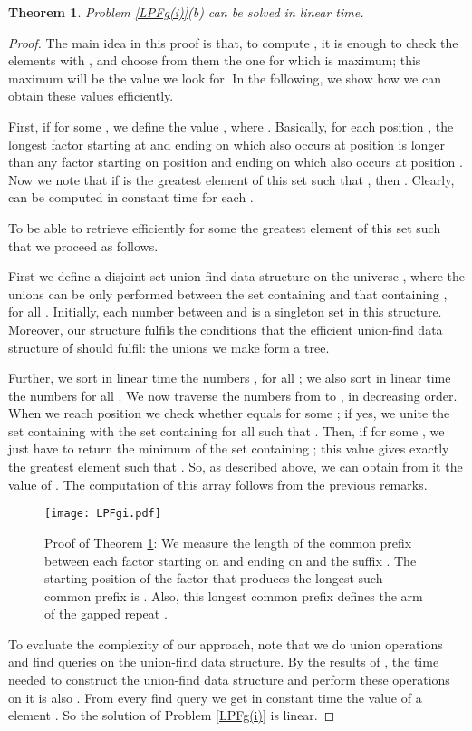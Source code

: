 \documentclass[final]{dmtcs-episciences}
\newtheorem{theorem}{Theorem}
\begin{document}
\begin{theorem}\label{LPFg(i)_sol_rep}
Problem \ref{LPFg(i)}(b) can be solved in linear time.
\end{theorem}
\begin{proof}
The main idea in this proof is that, to compute , it is enough to check the elements  with , and choose from them the one for which  is maximum; this maximum will be the value we look for. In the following, we show how we can obtain these values efficiently.

First, if  for some , we define the value , where . Basically, for each position , the longest factor  starting at  and ending on  which also occurs at position  is longer than any factor starting on position  and ending on  which also occurs at position . Now we note that if  is the greatest element of this set such that , then . Clearly,  can be computed in constant time for each .

To be able to retrieve efficiently for some  the greatest element of this set such that  we proceed as follows.

First we define a disjoint-set union-find data structure on the universe , where the unions can be only performed between the set containing  and that containing , for all . Initially, each number between  and  is a singleton set in this structure. Moreover, our structure fulfils the conditions that the efficient union-find data structure of \cite{Gabow83} should fulfil: the unions we make form a tree. 

Further, we sort in linear time the numbers , for all ; we also sort in linear time the numbers  for all . We now traverse the numbers from  to , in decreasing order. When we reach position  we check whether  equals  for some ; if yes, we unite the set containing  with the set containing  for all  such that . Then, if  for some , we just have to return the minimum of the set containing ; this value gives exactly 
the greatest element  such that . So, as described above, we can obtain from it the value of .  The computation of this array follows from the previous remarks.

\begin{figure}
\begin{center}
\texttt{[image: LPFgi.pdf]}
\end{center}
\caption{Proof of Theorem \ref{LPFg(i)_sol_rep}: We measure the length of the common prefix between each factor starting on  and ending on  and  the suffix . The starting position of the factor that produces the longest such common prefix is . Also, this longest common prefix defines the arm  of the gapped repeat .}
\end{figure}


To evaluate the complexity of our approach, note that we do  union operations and  find queries on the union-find data structure. By the results of \cite{Gabow83}, the time needed to construct the union-find data structure and perform these operations on it is also . From every find query we get in constant time the value of a element . So the solution of Problem \ref{LPFg(i)} is linear. 
\end{proof}
\end{document}
